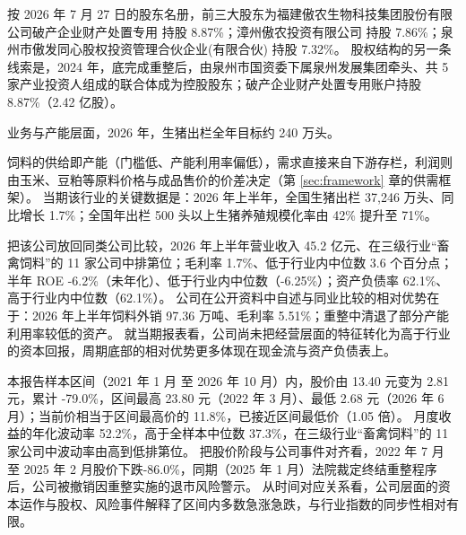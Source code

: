  按 2026 年 7 月 27 日的股东名册，前三大股东为福建傲农生物科技集团股份有限公司破产企业财产处置专用 持股 8.87\%；漳州傲农投资有限公司 持股 7.86\%；泉州市傲发同心股权投资管理合伙企业(有限合伙) 持股 7.32\%。 股权结构的另一条线索是，2024 年，底完成重整后，由泉州市国资委下属泉州发展集团牵头、共 5 家产业投资人组成的联合体成为控股股东；破产企业财产处置专用账户持股 8.87\%（2.42 亿股）。

 业务与产能层面，2026 年，生猪出栏全年目标约 240 万头。

 饲料的供给即产能（门槛低、产能利用率偏低），需求直接来自下游存栏，利润则由玉米、豆粕等原料价格与成品售价的价差决定（第 \ref{sec:framework} 章的供需框架）。 当期该行业的关键数据是：2026 年上半年，全国生猪出栏 37,246 万头、同比增长 1.7\%；全国年出栏 500 头以上生猪养殖规模化率由 42\% 提升至 71\%。

 把该公司放回同类公司比较，2026 年上半年营业收入 45.2 亿元、在三级行业“畜禽饲料”的 11 家公司中排第位；毛利率 1.7\%、低于行业内中位数 3.6 个百分点；半年 ROE -6.2\%（未年化）、低于行业内中位数（-6.25\%）；资产负债率 62.1\%、高于行业内中位数（62.1\%）。 公司在公开资料中自述与同业比较的相对优势在于：2026 年上半年饲料外销 97.36 万吨、毛利率 5.51\%；重整中清退了部分产能利用率较低的资产。 就当期报表看，公司尚未把经营层面的特征转化为高于行业的资本回报，周期底部的相对优势更多体现在现金流与资产负债表上。

 本报告样本区间（2021 年 1 月 至 2026 年 10 月）内，股价由 13.40 元变为 2.81 元，累计 -79.0\%，区间最高 23.80 元（2022 年 3 月）、最低 2.68 元（2026 年 6 月）；当前价相当于区间最高价的 11.8\%，已接近区间最低价（1.05 倍）。 月度收益的年化波动率 52.2\%，高于全样本中位数 37.3\%，在三级行业“畜禽饲料”的 11 家公司中波动率由高到低排第位。 把股价阶段与公司事件对齐看，2022 年 7 月 至 2025 年 2 月股价下跌-86.0\%，同期（2025 年 1 月）法院裁定终结重整程序后，公司被撤销因重整实施的退市风险警示。 从时间对应关系看，公司层面的资本运作与股权、风险事件解释了区间内多数急涨急跌，与行业指数的同步性相对有限。

